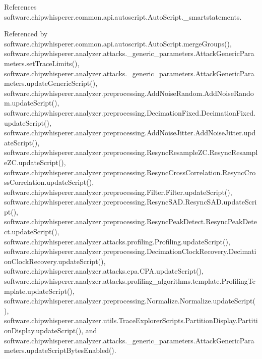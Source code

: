 References software.\+chipwhisperer.\+common.\+api.\+autoscript.\+Auto\+Script.\+\_\+smartstatements.



Referenced by software.\+chipwhisperer.\+common.\+api.\+autoscript.\+Auto\+Script.\+merge\+Groups(), software.\+chipwhisperer.\+analyzer.\+attacks.\+\_\+generic\+\_\+parameters.\+Attack\+Generic\+Parameters.\+set\+Trace\+Limits(), software.\+chipwhisperer.\+analyzer.\+attacks.\+\_\+generic\+\_\+parameters.\+Attack\+Generic\+Parameters.\+update\+Generic\+Script(), software.\+chipwhisperer.\+analyzer.\+preprocessing.\+Add\+Noise\+Random.\+Add\+Noise\+Random.\+update\+Script(), software.\+chipwhisperer.\+analyzer.\+preprocessing.\+Decimation\+Fixed.\+Decimation\+Fixed.\+update\+Script(), software.\+chipwhisperer.\+analyzer.\+preprocessing.\+Add\+Noise\+Jitter.\+Add\+Noise\+Jitter.\+update\+Script(), software.\+chipwhisperer.\+analyzer.\+preprocessing.\+Resync\+Resample\+Z\+C.\+Resync\+Resample\+Z\+C.\+update\+Script(), software.\+chipwhisperer.\+analyzer.\+preprocessing.\+Resync\+Cross\+Correlation.\+Resync\+Cross\+Correlation.\+update\+Script(), software.\+chipwhisperer.\+analyzer.\+preprocessing.\+Filter.\+Filter.\+update\+Script(), software.\+chipwhisperer.\+analyzer.\+preprocessing.\+Resync\+S\+A\+D.\+Resync\+S\+A\+D.\+update\+Script(), software.\+chipwhisperer.\+analyzer.\+preprocessing.\+Resync\+Peak\+Detect.\+Resync\+Peak\+Detect.\+update\+Script(), software.\+chipwhisperer.\+analyzer.\+attacks.\+profiling.\+Profiling.\+update\+Script(), software.\+chipwhisperer.\+analyzer.\+preprocessing.\+Decimation\+Clock\+Recovery.\+Decimation\+Clock\+Recovery.\+update\+Script(), software.\+chipwhisperer.\+analyzer.\+attacks.\+cpa.\+C\+P\+A.\+update\+Script(), software.\+chipwhisperer.\+analyzer.\+attacks.\+profiling\+\_\+algorithms.\+template.\+Profiling\+Template.\+update\+Script(), software.\+chipwhisperer.\+analyzer.\+preprocessing.\+Normalize.\+Normalize.\+update\+Script(), software.\+chipwhisperer.\+analyzer.\+utils.\+Trace\+Explorer\+Scripts.\+Partition\+Display.\+Partition\+Display.\+update\+Script(), and software.\+chipwhisperer.\+analyzer.\+attacks.\+\_\+generic\+\_\+parameters.\+Attack\+Generic\+Parameters.\+update\+Script\+Bytes\+Enabled().


